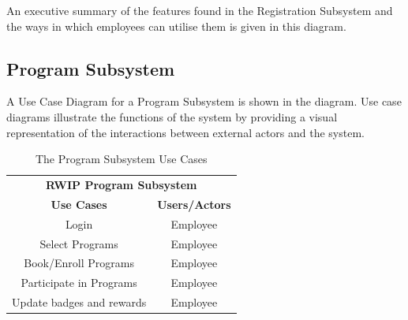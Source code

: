 \FloatBarrier

An executive summary of the features found in the Registration Subsystem and the ways in which employees can utilise them is given in this diagram. 

\subsection{Program Subsystem}
A Use Case Diagram for a Program Subsystem is shown in the diagram. Use case diagrams illustrate the functions of the system by providing a visual representation of the interactions between external actors and the system.

\begin{table}[h!t]
\caption{The Program Subsystem Use Cases}
{%
\newcommand{\mc}[2]{\multicolumn{#1}{#2}}
\begin{center}
\begin{tabular}{|c|c|}
\hline
\multicolumn{2}{|c|}{\textbf{RWIP Program Subsystem}} \\ \cline{1-2}
\textbf{Use Cases} & \textbf{Users/Actors} \\
\hline
\rule{0pt}{24pt}  Login & Employee \\
\hline
\rule{0pt}{24pt}  Select Programs & Employee \\
\hline
\rule{0pt}{24pt}  Book/Enroll Programs & Employee \\
\hline
\rule{0pt}{24pt}  Participate in Programs & Employee \\
\hline
\rule{0pt}{24pt}  Update badges and rewards & Employee \\
\hline
\end{tabular}
\end{center}
}%
\label{tab:program}
\end{table}

